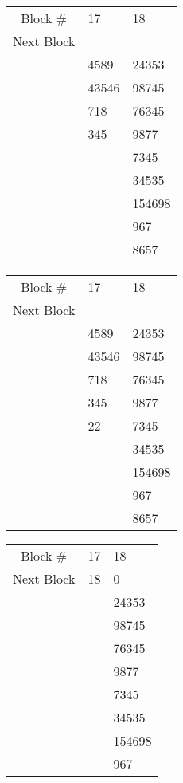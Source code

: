 \documentclass[a4paper,11pt]{exam}
\begin{document}
\begin{questions}
\begin{tabular}{|c|p{3.25em}|p{3.25em}|}
\hline
Block \# & 17 & 18\\ \cline{1-3}
Next Block & & \\ \cline{1-3}
\multirow{5}{*}{} & 4589 & 24353 \\ \cline{2-3}
	& 43546 & 98745 \\ \cline{2-3}
	& 718 & 76345 \\ \cline{2-3}
	& 345 & 9877 \\ \cline{2-3}
	&  & 7345 \\ \cline{2-3}
	&  & 34535 \\ \cline{2-3}
	&  & 154698 \\ \cline{2-3}
	&  & 967 \\ \cline{2-3}
	&  & 8657 \\ \cline{1-3}
\end{tabular}
\begin{tabular}{|c|p{3.25em}|p{3.25em}|}
\hline
Block \# & 17 &  18\\ \cline{1-3}
Next Block & & \\ \cline{1-3}
\multirow{5}{*}{} & 4589 & 24353 \\ \cline{2-3}
	& 43546 & 98745 \\ \cline{2-3}
	& 718 & 76345 \\ \cline{2-3}
	& 345 & 9877 \\ \cline{2-3}
	& 22 & 7345 \\ \cline{2-3}
	&  & 34535 \\ \cline{2-3}
	&  & 154698 \\ \cline{2-3}
	&  & 967 \\ \cline{2-3}
	&  & 8657 \\ \cline{1-3}
\end{tabular}
\begin{tabular}{|c|p{3.25em}|p{3.25em}|}
\hline
Block \# & 17 & 18 \\ \cline{1-3}
Next Block & 18 & 0 \\ \cline{1-3}
\multirow{5}{*}{} & & 24353 \\ \cline{2-3}
	&  & 98745 \\ \cline{2-3}
	&  & 76345 \\ \cline{2-3}
	&  & 9877 \\ \cline{2-3}
	&  & 7345 \\ \cline{2-3}
	&  & 34535 \\ \cline{2-3}
	&  & 154698 \\ \cline{2-3}
	&  & 967 \\ \cline{2-3}

\end{tabular}
\end{questions}
\end{document}
